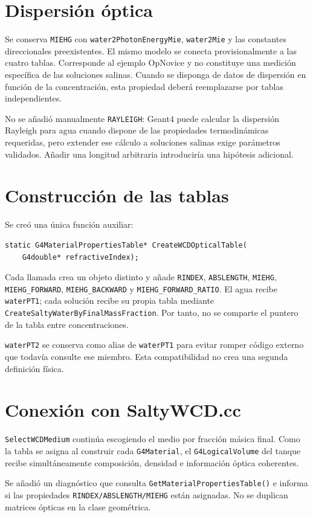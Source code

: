 \documentclass[11pt,a4paper]{article}
\newcommand{\codigo}[1]{\texttt{#1}}
\begin{document}
\section{Dispersión óptica}
Se conserva \codigo{MIEHG} con \codigo{water2PhotonEnergyMie},
\codigo{water2Mie} y las constantes direccionales preexistentes. El mismo
modelo se conecta provisionalmente a las cuatro tablas. Corresponde al ejemplo
OpNovice y no constituye una medición específica de las soluciones salinas.
Cuando se disponga de datos de dispersión en función de la concentración, esta
propiedad deberá reemplazarse por tablas independientes.

No se añadió manualmente \codigo{RAYLEIGH}: Geant4 puede calcular la
dispersión Rayleigh para agua cuando dispone de las propiedades termodinámicas
requeridas, pero extender ese cálculo a soluciones salinas exige parámetros
validados. Añadir una longitud arbitraria introduciría una hipótesis adicional.

\section{Construcción de las tablas}
Se creó una única función auxiliar:
\begin{lstlisting}
static G4MaterialPropertiesTable* CreateWCDOpticalTable(
    G4double* refractiveIndex);
\end{lstlisting}
Cada llamada crea un objeto distinto y añade \codigo{RINDEX},
\codigo{ABSLENGTH}, \codigo{MIEHG}, \codigo{MIEHG\_FORWARD},
\codigo{MIEHG\_BACKWARD} y \codigo{MIEHG\_FORWARD\_RATIO}. El agua recibe
\codigo{waterPT1}; cada solución recibe su propia tabla mediante
\codigo{CreateSaltyWaterByFinalMassFraction}. Por tanto, no se comparte el
puntero de la tabla entre concentraciones.

\codigo{waterPT2} se conserva como alias de \codigo{waterPT1} para evitar
romper código externo que todavía consulte ese miembro. Esta compatibilidad no
crea una segunda definición física.

\section{Conexión con SaltyWCD.cc}
\codigo{SelectWCDMedium} continúa escogiendo el medio por fracción másica
final. Como la tabla se asigna al construir cada \codigo{G4Material}, el
\codigo{G4LogicalVolume} del tanque recibe simultáneamente composición,
densidad e información óptica coherentes.

Se añadió un diagnóstico que consulta
\codigo{GetMaterialPropertiesTable()} e informa si las propiedades
\codigo{RINDEX/ABSLENGTH/MIEHG} están asignadas. No se duplican matrices
ópticas en la clase geométrica.
\end{document}
